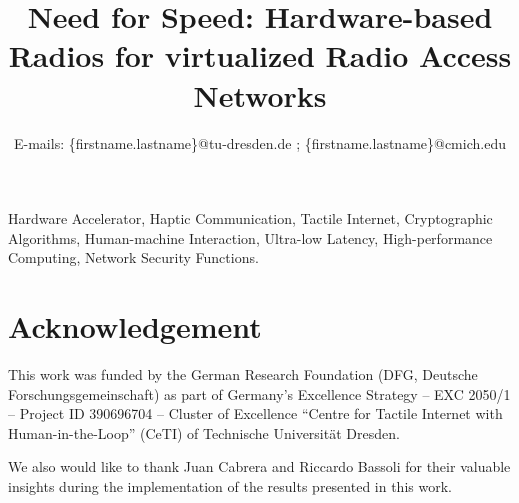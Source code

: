 \documentclass[conference]{IEEEtran}
\begin{document}
\title{Need for Speed: Hardware-based Radios for virtualized Radio Access Networks}
\author{
	E-mails: \{firstname.lastname\}@tu-dresden.de ;	\{firstname.lastname\}@cmich.edu
}

\maketitle

\thispagestyle{plain}
\pagestyle{plain}

\begingroup\renewcommand\thefootnote{\textsection}

\endgroup



\begin{IEEEkeywords}
Hardware Accelerator, Haptic Communication, Tactile Internet, Cryptographic Algorithms, Human-machine Interaction, Ultra-low Latency, High-performance Computing, Network Security Functions. 
\end{IEEEkeywords}










%

\section*{Acknowledgement}
This work was funded by the German Research Foundation (DFG, Deutsche Forschungsgemeinschaft) as part of Germany’s Excellence Strategy – EXC 2050/1 – Project ID 390696704 – Cluster of Excellence “Centre for Tactile Internet with Human-in-the-Loop” (CeTI) of Technische Universität Dresden.

We also would like to thank Juan Cabrera and Riccardo Bassoli for their valuable insights during the implementation of the results presented in this work.


\end{document}
